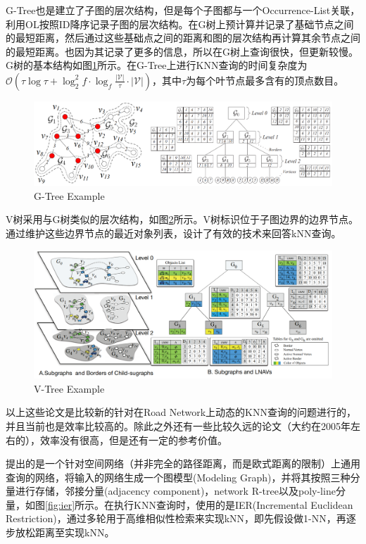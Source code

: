 \documentclass{ML}
\begin{document}
G-Tree\cite{G-tree}也是建立了子图的层次结构，但是每个子图都与一个Occurrence-List关联，利用OL按照ID降序记录子图的层次结构。在G树上预计算并记录了基础节点之间的最短距离，然后通过这些基础点之间的距离和图的层次结构再计算其余节点之间的最短距离。也因为其记录了更多的信息，所以在G树上查询很快，但更新较慢。G树的基本结构如图\ref{fig:G-tree}所示。在G-Tree上进行KNN查询的时间复杂度为$\mathcal{O}\left(\tau \log \tau+\log _{2}^{2} f \cdot \log _{f} \frac{|\mathcal{V}|}{\tau} \cdot|\mathcal{V}|\right)$，其中$\tau$为每个叶节点最多含有的顶点数目。

\begin{figure}[htb]
	\centering
	\includegraphics[width=0.9\linewidth]{media/g-tree.png}
	\caption{G-Tree Example}\label{fig:G-tree}
\end{figure}

V树\cite{V-tree}采用与G树类似的层次结构，如图\ref{fig:V-tree}所示。V树标识位于子图边界的边界节点。通过维护这些边界节点的最近对象列表，设计了有效的技术来回答kNN查询。

\begin{figure}[htb]
	\centering
	\includegraphics[width=0.9\linewidth]{media/v-tree.png}
	\caption{V-Tree Example}\label{fig:V-tree}
\end{figure}

以上这些论文是比较新的针对在Road Network上动态的KNN查询的问题进行的，并且当前也是效率比较高的。除此之外还有一些比较久远的论文（大约在2005年左右的），效率没有很高，但是还有一定的参考价值。

\cite{IER}提出的是一个针对空间网络（并非完全的路径距离，而是欧式距离的限制）上通用查询的网络，将输入的网络生成一个图模型(Modeling Graph)，并将其按照三种分量进行存储，邻接分量(adjacency component)，network R-tree以及poly-line分量，如图\ref{fig:ier}所示。在执行KNN查询时，使用的是IER(Incremental Euclidean Restriction)，通过多轮用于高维相似性检索来实现kNN，即先假设做1-NN，再逐步放松距离至实现kNN。
\end{document}
